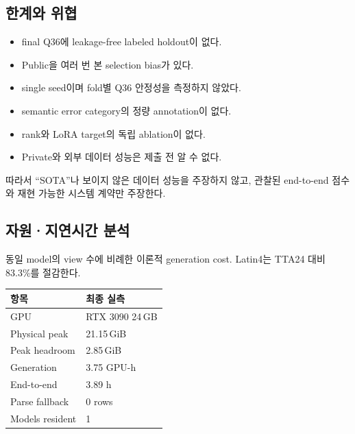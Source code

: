 \documentclass[9pt,a4paper]{extarticle}
\newcommand{\tightnote}[1]{{\scriptsize #1}}
\begin{document}
\begin{multicols}{2}
\subsection{한계와 위협}

\begin{itemize}
\item final Q36에 leakage-free labeled holdout이 없다.
\item Public을 여러 번 본 selection bias가 있다.
\item single seed이며 fold별 Q36 안정성을 측정하지 않았다.
\item semantic error category의 정량 annotation이 없다.
\item rank와 LoRA target의 독립 ablation이 없다.
\item Private와 외부 데이터 성능은 제출 전 알 수 없다.
\end{itemize}

따라서 ``SOTA''나 보이지 않은 데이터 성능을 주장하지 않고, 관찰된 end-to-end
점수와 재현 가능한 시스템 계약만 주장한다.

\columnbreak
\subsection{자원·지연시간 분석}

\tightnote{동일 model의 view 수에 비례한 이론적 generation cost.
Latin4는 TTA24 대비 83.3\%를 절감한다.}

\begin{tabularx}{\linewidth}{@{}lR{22mm}@{}}
\toprule
항목 & 최종 실측\\
\midrule
GPU & RTX 3090 24\,GB\\
Physical peak & 21.15\,GiB\\
Peak headroom & 2.85\,GiB\\
Generation & 3.75 GPU-h\\
End-to-end & 3.89 h\\
Parse fallback & 0 rows\\
Models resident & 1\\
\bottomrule
\end{tabularx}


\end{multicols}
\end{document}
